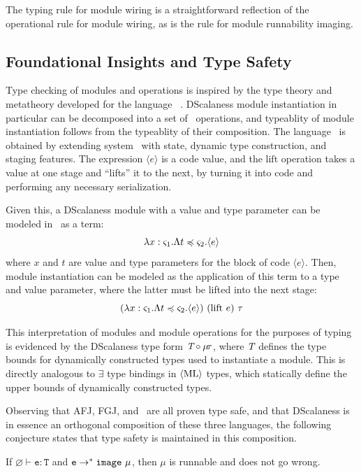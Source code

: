 The  typing rule for module wiring is a straightforward reflection of the
operational rule for module wiring, as is the  rule for module runnability
imaging.

\subsection{Foundational Insights and Type Safety} 
\label{section-framedml}


Type checking of modules and operations is inspired by the type theory and metatheory developed
for the language \fml\ \cite{FramedML}. DScalaness module instantiation in particular can be
decomposed into a set of \fml\ operations, and typeablity of module instantiation follows from
the typeablity of their composition. The language \fml\ is obtained by extending system \fsub\
with state, dynamic type construction, and staging features. The expression $\langle e \rangle$
is a code value, and the $\mathrm{lift}$ operation takes a value at one stage and ``lifts'' it
to the next, by turning it into code and performing any necessary serialization.

Given this, a DScalaness module with a value and type parameter can be
modeled in \fml\ as a term: 
$$\lambda x : \varsigma_1 . \Lambda t \preccurlyeq \varsigma_2 . \langle e \rangle$$
where $x$ and $t$ are value and type parameters for the block of code $\langle e \rangle$. Then,
module instantiation can be modeled as the application of this term to a type and value
parameter, where the latter must be lifted into the next stage:
$$
(\lambda x : \s_1 . \Lambda t \subtype \s_2 . \langle e \rangle)\ (\mathrm{lift}\ e)\ \t
$$ 

This interpretation of modules and module operations for the purposes of typing is evidenced by
the DScalaness type form $\textit{T} \circ \mu\!\tau$, where $\textit{T}$ defines the type bounds
for dynamically constructed types used to instantiate a module. This is directly analogous to
$\exists$ type bindings in $\langle \text{ML} \rangle$ types, which statically define the upper bounds of dynamically
constructed types.

Observing that AFJ, FGJ, and \fml\ are all proven type safe, and that DScalaness is in essence
an orthogonal composition of these three languages, the following conjecture states that type
safety is maintained in this composition.

\begin{conject}
  If $\varnothing \vdash \texttt{e} : \texttt{T}$ and $\texttt{e} \rightarrow^* \mathtt{image}\ \mu$,
  then $\mu$ is runnable and does not go wrong.
\end{conject}

